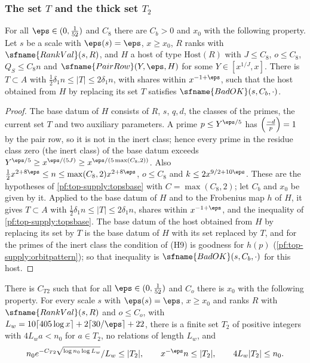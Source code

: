 \subsubsection{The set $T$ and the thick set $T_2$}

\begin{lemma}\label{pf:top-supply:tops}
For all $\eps\in(0,\frac1{52})$ and $C_8$ there are $C_b>0$ and $x_0$ with the following property. Let $s$ be a scale with
$\eps(s)=\eps$, $x\ge x_0$, $R$ ranks with $\sfname{RankVal}(s,R)$, and $H$ a host of type $\mathrm{Host}(R)$ with $J\le C_8$,
$o\le C_8$, $Q_S\le C_8n$ and $\sfname{PairRow}(Y,\eps,H)$ for some $Y\in[x^{1/J},x]$. There is $T\subset A$ with
$\frac12\delta_1n\le|T|\le2\delta_1n$, with shares within $x^{-1+\eps}$, such that the host obtained from $H$ by replacing its
set $T$ satisfies $\sfname{BadOK}(s,C_b,\cdot)$.
\end{lemma}

\begin{proof}
The base datum of $H$ consists of $R$, $s$, $q,d$, the classes of the primes, the current set $T$ and two auxiliary parameters. A prime $p\le Y^{\eps/5}$ has $\left(\frac{-d}{p}\right)=1$ by the pair row, so it is not in the
inert class; hence every prime in the residue class zero (the inert class) of the base datum exceeds
$Y^{\eps/5}\ge x^{\eps/(5J)}\ge x^{\eps/(5\max(C_8,2))}$. Also $\frac12x^{2+8\eps}\le n\le\max(C_8,2)x^{2+8\eps}$, $o\le C_8$ and
$k\le2x^{9/2+10\eps}$. These are the hypotheses of \cref{pf:top-supply:topsbase} with $C=\max(C_8,2)$; let $C_b$ and $x_0$
be given by it. Applied to the base datum of $H$ and to the Frobenius map $h$ of $H$, it gives $T\subset A$ with
$\frac12\delta_1n\le|T|\le2\delta_1n$, shares within $x^{-1+\eps}$, and the inequality of \cref{pf:top-supply:topsbase}. The
base datum of the host obtained from $H$ by replacing its set by $T$ is the base datum of $H$ with its set replaced by $T$,
and for the primes of the inert class the condition of (H9) is goodness for $h(p)$ (\cref{pf:top-supply:orbitpattern}); so
that inequality is $\sfname{BadOK}(s,C_b,\cdot)$ for this host.
\end{proof}

\begin{lemma}\label{pf:top-supply:thick}
There is $C_{T2}$ such that for all $\eps\in(0,\frac1{52})$ and $C_o$ there is $x_0$ with the following property. For every
scale $s$ with $\eps(s)=\eps$, $x\ge x_0$ and ranks $R$ with $\sfname{RankVal}(s,R)$ and $o\le C_o$, with
$L_w=10\lceil405\log x\rceil+2\lceil30/\eps\rceil+22$, there is a finite set $T_2$ of positive integers with $4L_wa<n_0$ for
$a\in T_2$, no relations of length $L_w$, and
\[
n_0e^{-C_{T2}\sqrt{\log n_0\log L_w}}/L_w\le|T_2|,\qquad x^{-\eps}n\le|T_2|,\qquad4L_w|T_2|\le n_0.
\]
\end{lemma}

